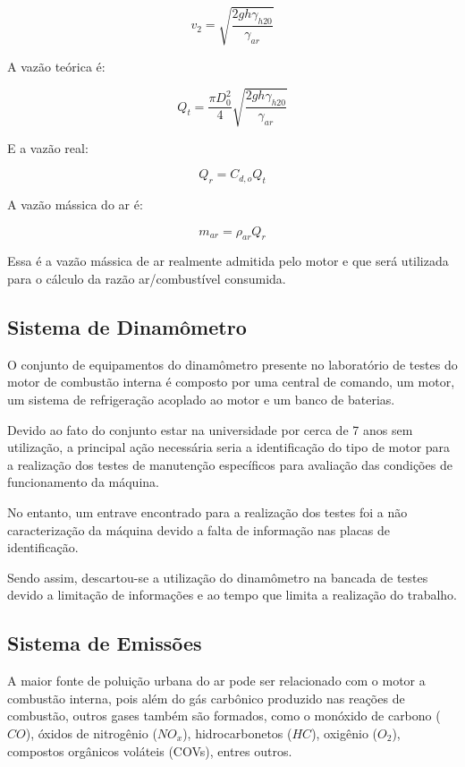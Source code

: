 \begin{equation}
	v_{2} = \sqrt{\frac{2gh\gamma _{h20}}{\gamma _{ar}}}
\end{equation}

A vazão teórica é:

\begin{equation}
	Q_{t} = \frac{\pi D_{0}^{2}}{4}\sqrt{\frac{2gh\gamma _{h20}}{\gamma _{ar}}}
\end{equation}

E a vazão real:

\begin{equation}
	Q_{r} = C_{d,o}Q_{t}
\end{equation}

A vazão mássica do ar é:

\begin{equation}
	m_{ar} = \rho _{ar}Q_{r}
\end{equation}

Essa é a vazão mássica de ar realmente admitida pelo motor  e que será utilizada para o cálculo da razão ar/combustível consumida.

\subsection{Sistema de Dinamômetro}

O conjunto de equipamentos do dinamômetro presente no laboratório de testes do motor de combustão interna é composto por uma central de comando, um motor, um sistema de refrigeração acoplado ao motor e um banco de baterias.

Devido ao fato do conjunto estar na universidade por cerca de 7 anos sem utilização, a principal ação necessária seria a identificação do tipo de motor para a realização dos testes de manutenção específicos para avaliação das condições de funcionamento da máquina.

No entanto, um entrave encontrado para a realização dos testes foi a não caracterização da máquina devido a falta de informação nas placas de identificação.

Sendo assim, descartou-se a utilização do dinamômetro na bancada de testes devido a limitação de informações e ao tempo que limita a realização do trabalho.


\subsection{Sistema de Emissões}

A maior fonte de poluição urbana do ar pode ser relacionado com o motor a combustão interna, pois além do gás carbônico produzido nas reações de combustão, outros gases também são formados, como  o monóxido de carbono ($CO$), óxidos de nitrogênio ($NO_{x}$), hidrocarbonetos ($HC$), oxigênio ($O_{2}$), compostos orgânicos voláteis (COVs), entres outros.

